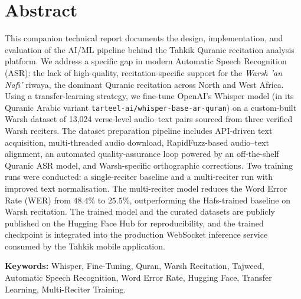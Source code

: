 \documentclass[12pt,a4paper]{report}
\begin{document}
\section*{Abstract}
This companion technical report documents the design, implementation, and
evaluation of the AI/ML pipeline behind the Tahkik Quranic recitation
analysis platform. We address a specific gap in modern Automatic Speech
Recognition (ASR): the lack of high-quality, recitation-specific support for
the \textit{Warsh 'an Naf{\^\i}'} riwaya, the dominant Quranic recitation
across North and West Africa. Using a transfer-learning strategy, we
fine-tune OpenAI's Whisper model (in its Quranic Arabic variant
\texttt{tarteel-ai/whisper-base-ar-quran}) on a custom-built Warsh dataset of
13{,}024 verse-level audio--text pairs sourced from three verified Warsh
reciters. The dataset preparation pipeline includes API-driven text
acquisition, multi-threaded audio download, RapidFuzz-based audio--text
alignment, an automated quality-assurance loop powered by an off-the-shelf
Quranic ASR model, and Warsh-specific orthographic corrections. Two training
runs were conducted: a single-reciter baseline and a multi-reciter run with
improved text normalisation. The multi-reciter model reduces the Word Error
Rate (WER) from $48.4\%$ to $25.5\%$, outperforming the Hafs-trained
baseline on Warsh recitation. The trained model and the curated datasets are
publicly published on the Hugging Face Hub for reproducibility, and the
trained checkpoint is integrated into the production WebSocket inference
service consumed by the Tahkik mobile application.

\textbf{Keywords:} Whisper, Fine-Tuning, Quran, Warsh Recitation, Tajweed,
Automatic Speech Recognition, Word Error Rate, Hugging Face, Transfer
Learning, Multi-Reciter Training.

\vspace{0.8cm}
\end{document}
